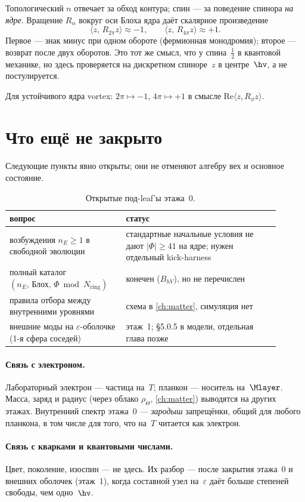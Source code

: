 Топологический $n$ отвечает за обход контура; спин --- за поведение спинора \emph{на ядре}.
Вращение $R_\alpha$ вокруг оси Блоха ядра даёт скалярное произведение
\[
  \langle z,\, R_{2\pi} z\rangle \approx -1,
  \qquad
  \langle z,\, R_{4\pi} z\rangle \approx +1.
\]
Первое --- знак минус при одном обороте (фермионная монодромия);
второе --- возврат после двух оборотов.
Это тот же смысл, что у спина~$\tfrac12$ в квантовой механике,
но здесь проверяется на дискретном спиноре~$z$ в центре~$\hv$, а не постулируется.

\begin{proposition}
\label{prop:floor0-su2-monodromy}
Для устойчивого ядра vortex: $2\pi\mapsto -1$, $4\pi\mapsto +1$ в смысле
$\mathrm{Re}\langle z, R_\phi z\rangle$.
\end{proposition}

\section{Что ещё не закрыто}
\label{sec:floor0-open}

Следующие пункты явно открыты; они не отменяют алгебру вех и основное состояние.

\begin{table}[htbp]
  \centering
  \caption{Открытые под-leaf'ы этажа~0.}
  \label{tab:floor0-open}
  \begin{tabular}{@{}p{0.38\linewidth}p{0.52\linewidth}@{}}
    \toprule
    вопрос & статус \\
    \midrule
    возбуждения $n_E\ge 1$ в свободной эволюции &
    стандартные начальные условия не дают $|\Phi|\ge 41$ на ядре;
    нужен отдельный kick-harness \\
    полный каталог $(n_E,\,\text{Блох},\,\Phi\bmod N_{\mathrm{ring}})$ &
    конечен ($B_{hV}$), но не перечислен \\
    правила отбора между внутренними уровнями &
    схема в \cref{ch:matter}, симуляция нет \\
    внешние моды на $\varepsilon$-оболочке (1-я сфера соседей) &
    этаж~1; \S5.0.5 в модели, отдельная глава позже \\
    \bottomrule
  \end{tabular}
\end{table}

\paragraph{Связь с электроном.}
Лабораторный электрон --- частица на~$T$; планкон --- носитель на~$\Mlayer$.
Масса, заряд и радиус (через облако $\rho_\Theta$, \cref{ch:matter}) выводятся на других этажах.
Внутренний спектр этажа~0 --- \emph{зародыш} запрещёнки, общий для любого планкона,
в том числе для того, что на~$T$ читается как электрон.

\paragraph{Связь с кварками и квантовыми числами.}
Цвет, поколение, изоспин --- не здесь.
Их разбор --- после закрытия этажа~0 и внешних оболочек (этаж~1),
когда составной узел на~$\varepsilon$ даёт больше степеней свободы, чем одно~$\hv$.

